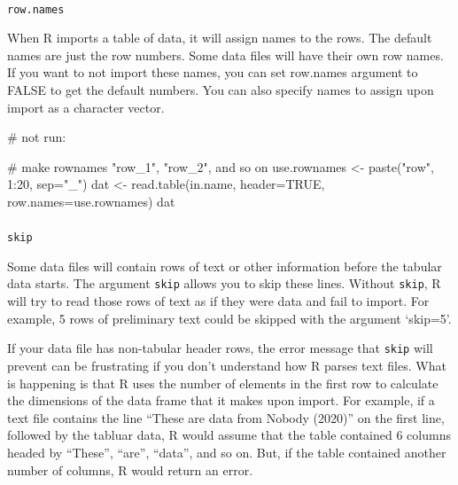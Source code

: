 \documentclass[
  13,
  letterpaper,
]{report}
\makeatletter
\let\oldparagraph\paragraph
\renewcommand{\paragraph}{
    \@ifstar
      \xxxParagraphStar
      \xxxParagraphNoStar
  }
\newcommand{\xxxParagraphStar}[1]{\oldparagraph*{#1}\mbox{}}
\newcommand{\xxxParagraphNoStar}[1]{\oldparagraph{#1}\mbox{}}
\newenvironment{Shaded}{\begin{snugshade}}{\end{snugshade}}
\newcommand{\AttributeTok}[1]{\textcolor[rgb]{0.40,0.45,0.13}{#1}}
\newcommand{\CommentTok}[1]{\textcolor[rgb]{0.37,0.37,0.37}{#1}}
\newcommand{\ConstantTok}[1]{\textcolor[rgb]{0.56,0.35,0.01}{#1}}
\newcommand{\DecValTok}[1]{\textcolor[rgb]{0.68,0.00,0.00}{#1}}
\newcommand{\FunctionTok}[1]{\textcolor[rgb]{0.28,0.35,0.67}{#1}}
\newcommand{\NormalTok}[1]{\textcolor[rgb]{0.00,0.23,0.31}{#1}}
\newcommand{\OtherTok}[1]{\textcolor[rgb]{0.00,0.23,0.31}{#1}}
\newcommand{\SpecialCharTok}[1]{\textcolor[rgb]{0.37,0.37,0.37}{#1}}
\newcommand{\StringTok}[1]{\textcolor[rgb]{0.13,0.47,0.30}{#1}}
\makeatother
\begin{document}
\paragraph{\texorpdfstring{\texttt{row.names}}{row.names}}\label{row.names}

When R imports a table of data, it will assign names to the rows. The
default names are just the row numbers. Some data files will have their
own row names. If you want to not import these names, you can set
row.names argument to FALSE to get the default numbers. You can also
specify names to assign upon import as a character vector.

\begin{Shaded}
\begin{Highlighting}[]
\CommentTok{\# not run:}

\CommentTok{\# make rownames "row\_1", "row\_2", and so on}
\NormalTok{use.rownames }\OtherTok{\textless{}{-}} \FunctionTok{paste}\NormalTok{(}\StringTok{"row"}\NormalTok{, }\DecValTok{1}\SpecialCharTok{:}\DecValTok{20}\NormalTok{, }\AttributeTok{sep=}\StringTok{"\_"}\NormalTok{)}
\NormalTok{dat }\OtherTok{\textless{}{-}} \FunctionTok{read.table}\NormalTok{(in.name, }\AttributeTok{header=}\ConstantTok{TRUE}\NormalTok{, }\AttributeTok{row.names=}\NormalTok{use.rownames)}
\NormalTok{dat}
\end{Highlighting}
\end{Shaded}

\paragraph{\texorpdfstring{\texttt{skip}}{skip}}\label{skip}

Some data files will contain rows of text or other information before
the tabular data starts. The argument \texttt{skip} allows you to skip
these lines. Without \texttt{skip}, R will try to read those rows of
text as if they were data and fail to import. For example, 5 rows of
preliminary text could be skipped with the argument `skip=5'.

If your data file has non-tabular header rows, the error message that
\texttt{skip} will prevent can be frustrating if you don't understand
how R parses text files. What is happening is that R uses the number of
elements in the first row to calculate the dimensions of the data frame
that it makes upon import. For example, if a text file contains the line
``These are data from Nobody (2020)'' on the first line, followed by the
tabluar data, R would assume that the table contained 6 columns headed
by ``These'', ``are'', ``data'', and so on. But, if the table contained
another number of columns, R would return an error.
\end{document}
